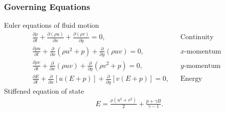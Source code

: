 \begin{frame} \frametitle{\vspace*{0.5cm}Governing Equations}
  {\small
    \hspace*{1cm}Euler equations of fluid motion
  }
  {\scriptsize
    \begin{align*}%
      \frac{\partial \rho}{\partial t} + \frac{\partial \left(\rho u\right)}{\partial x} + \frac{\partial \left(\rho v\right)}{\partial y} = 0,&&\text{Continuity}\\
      \frac{\partial \rho u}{\partial t} + \frac{\partial}{\partial x}\left( \rho u^2+p\right)  + \frac{\partial}{\partial y}\left( \rho uv\right) = 0,&&\text{$x$-momentum}&\\
      \frac{\partial \rho v}{\partial t} + \frac{\partial}{\partial x}\left( \rho uv\right)  + \frac{\partial}{\partial y}\left( \rho v^2+p\right) = 0,&&\text{$y$-momentum}\\
      \frac{\partial E}{\partial t} + \frac{\partial}{\partial x}\left[u\left(E+p\right)\right] + \frac{\partial}{\partial y}\left[v\left(E+p\right)\right] = 0,&&\text{Energy}
    \end{align*}%
  }
  \vfil
  {\small
    \hspace*{1cm}Stiffened equation of state
  }
  {\scriptsize
    \begin{align*}%
      E=\frac{\rho\left(u^2+v^2\right)}{2} + \frac{p+\gamma B}{\gamma-1}.
    \end{align*}
  }
\end{frame}
